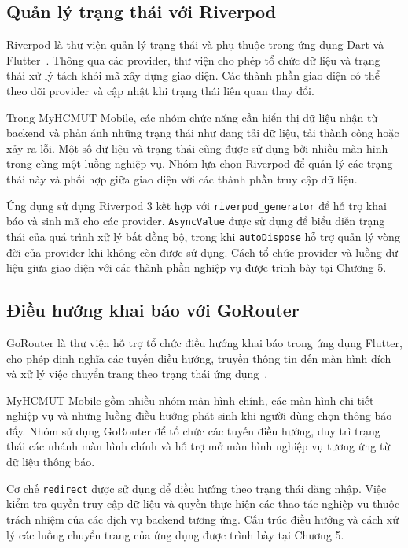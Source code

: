 \subsection{Quản lý trạng thái với Riverpod}
\label{subsec:riverpod_state}

Riverpod là thư viện quản lý trạng thái và phụ thuộc trong ứng dụng Dart và Flutter~\cite{riverpod_doc}. Thông qua các provider, thư viện cho phép tổ chức dữ liệu và trạng thái xử lý tách khỏi mã xây dựng giao diện. Các thành phần giao diện có thể theo dõi provider và cập nhật khi trạng thái liên quan thay đổi.

Trong MyHCMUT Mobile, các nhóm chức năng cần hiển thị dữ liệu nhận từ backend và phản ánh những trạng thái như đang tải dữ liệu, tải thành công hoặc xảy ra lỗi. Một số dữ liệu và trạng thái cũng được sử dụng bởi nhiều màn hình trong cùng một luồng nghiệp vụ. Nhóm lựa chọn Riverpod để quản lý các trạng thái này và phối hợp giữa giao diện với các thành phần truy cập dữ liệu.

Ứng dụng sử dụng Riverpod 3 kết hợp với \texttt{riverpod\_generator} để hỗ trợ khai báo và sinh mã cho các provider. \texttt{AsyncValue} được sử dụng để biểu diễn trạng thái của quá trình xử lý bất đồng bộ, trong khi \texttt{autoDispose} hỗ trợ quản lý vòng đời của provider khi không còn được sử dụng. Cách tổ chức provider và luồng dữ liệu giữa giao diện với các thành phần nghiệp vụ được trình bày tại Chương 5.

\subsection{Điều hướng khai báo với GoRouter}
\label{subsec:gorouter_nav}

GoRouter là thư viện hỗ trợ tổ chức điều hướng khai báo trong ứng dụng Flutter, cho phép định nghĩa các tuyến điều hướng, truyền thông tin đến màn hình đích và xử lý việc chuyển trang theo trạng thái ứng dụng~\cite{gorouter_doc}.

MyHCMUT Mobile gồm nhiều nhóm màn hình chính, các màn hình chi tiết nghiệp vụ và những luồng điều hướng phát sinh khi người dùng chọn thông báo đẩy. Nhóm sử dụng GoRouter để tổ chức các tuyến điều hướng, duy trì trạng thái các nhánh màn hình chính và hỗ trợ mở màn hình nghiệp vụ tương ứng từ dữ liệu thông báo.

Cơ chế \texttt{redirect} được sử dụng để điều hướng theo trạng thái đăng nhập. Việc kiểm tra quyền truy cập dữ liệu và quyền thực hiện các thao tác nghiệp vụ thuộc trách nhiệm của các dịch vụ backend tương ứng. Cấu trúc điều hướng và cách xử lý các luồng chuyển trang của ứng dụng được trình bày tại Chương 5.

